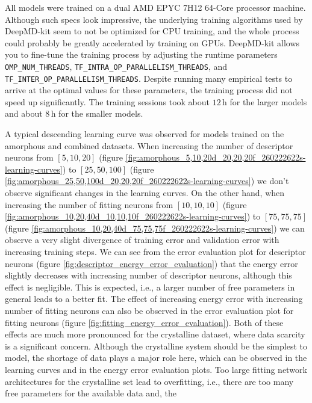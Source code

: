 All models were trained on a dual AMD EPYC 7H12 64-Core processor machine.
Although such specs look impressive, the underlying training algorithms used
by DeepMD-kit seem to not be optimized for CPU training, and the whole process
could probably be greatly accelerated by training on GPUs. DeepMD-kit allows
you to fine-tune the training process by adjusting the runtime parameters
\texttt{OMP\_NUM\_THREADS}, \texttt{TF\_INTRA\_OP\_PARALLELISM\_THREADS},
and \texttt{TF\_INTER\_OP\_PARALLELISM\_\allowbreak{}THREADS}. Despite running
many empirical tests to arrive at the optimal values for these parameters, the
training process did not speed up significantly. The training sessions took
about $12 \, \mathrm{h}$ for the larger models and about $8 \, \mathrm{h}$ for
the smaller models.

A typical descending learning curve was observed for models trained on the
amorphous and combined datasets. When increasing the number of descriptor
neurons from $[5, 10, 20]$ (figure
\ref{fig:amorphous_5,10,20d_20,20,20f_260222622s-learning-curves}) to
$[25, 50, 100]$ (figure
\ref{fig:amorphous_25,50,100d_20,20,20f_260222622s-learning-curves}) we don't
observe significant changes in the learning curves. On the other hand, when
increasing the number of fitting neurons from $[10, 10, 10]$
(figure \ref{fig:amorphous_10,20,40d_10,10,10f_260222622s-learning-curves}) to
$[75, 75, 75]$ (figure
\ref{fig:amorphous_10,20,40d_75,75,75f_260222622s-learning-curves}) we can
observe a very slight divergence of training error and validation error with
increasing training steps. We can see from the error evaluation plot for
descriptor neurons (figure \ref{fig:descriptor_energy_error_evaluation}) that
the energy error slightly decreases with increasing number of descriptor
neurons, although this effect is negligible. This is expected, i.e., a larger
number of free parameters in general leads to a better fit. The effect of
increasing energy error with increasing number of fitting neurons can also be
observed in the error evaluation plot for fitting neurons (figure
\ref{fig:fitting_energy_error_evaluation}). Both of these effects are much
more pronounced for the crystalline dataset, where data scarcity is a
significant concern. Although the crystalline system should be the simplest
to model, the shortage of data plays a major role here, which can be observed
in the learning curves and in the energy error evaluation plots. Too large
fitting network architectures for the crystalline set lead to overfitting,
i.e., there are too many free parameters for the available data and, the
